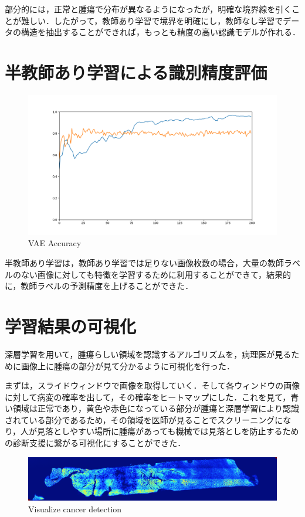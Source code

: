 部分的には，正常と腫瘍で分布が異なるようになったが，明確な境界線を引くことが難しい．したがって，教師あり学習で境界を明確にし，教師なし学習でデータの構造を抽出することができれば，もっとも精度の高い認識モデルが作れる．

\section{半教師あり学習による識別精度評価}

\begin{figure}[H]
	\centering
	\includegraphics[width=0.7\linewidth]{fig/chapter4/accuracy_summary}
	\caption{VAE Accuracy}
	\label{fig:accuracysummary}
\end{figure}

半教師あり学習は，教師あり学習では足りない画像枚数の場合，大量の教師ラベルのない画像に対しても特徴を学習するために利用することができて，結果的に，教師ラベルの予測精度を上げることができた．


\section{学習結果の可視化}
深層学習を用いて，腫瘍らしい領域を認識するアルゴリズムを，病理医が見るために画像上に腫瘍の部分が見て分かるように可視化を行った．


まずは，スライドウィンドウで画像を取得していく．そして各ウィンドウの画像に対して病変の確率を出して，その確率をヒートマップにした．これを見て，青い領域は正常であり，黄色や赤色になっている部分が腫瘍と深層学習により認識されている部分であるため，その領域を医師が見ることでスクリーニングになり，人が見落としやすい場所に腫瘍があっても機械では見落としを防止するための診断支援に繋がる可視化にすることができた．

\begin{figure}[H]
	\centering
	\includegraphics[width=0.7\linewidth]{fig/chapter4/visualization/sample_B}
	\caption{Visualize cancer detection}
	\label{fig:sampleb}
\end{figure}

